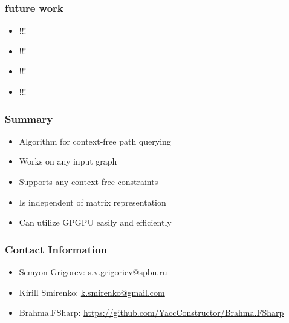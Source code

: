 \documentclass[xcolor=table]{beamer}
\begin{document}
\begin{frame}
  \transwipe[direction=90]
  \frametitle{future work}         
\begin{itemize}
\item !!!
\item !!!
\item !!!
\item !!!
\end{itemize}
\end{frame}     
            
            
\begin{frame}
  \transwipe[direction=90]
  \frametitle{Summary}         
\begin{itemize}
\item Algorithm for context-free path querying 
\item Works on any input graph
\item Supports any context-free constraints 
\item Is independent of matrix representation
\item Can utilize GPGPU easily and efficiently 
\end{itemize}
\end{frame}           
            
\begin{frame}
\transwipe[direction=90]
\frametitle{Contact Information}
\begin{itemize}
  \item Semyon Grigorev: \href{mailto:s.v.grigoriev@spbu.ru}{s.v.grigoriev@spbu.ru}
  \item Kirill Smirenko: \href{mailto:k.smirenko@gmail.com}{k.smirenko@gmail.com}
\end{itemize}
\begin{itemize}
  \item Brahma.FSharp: \href{https://github.com/YaccConstructor/Brahma.FSharp}{https://github.com/YaccConstructor/Brahma.FSharp}
\end{itemize}
\end{frame}
\end{document}
